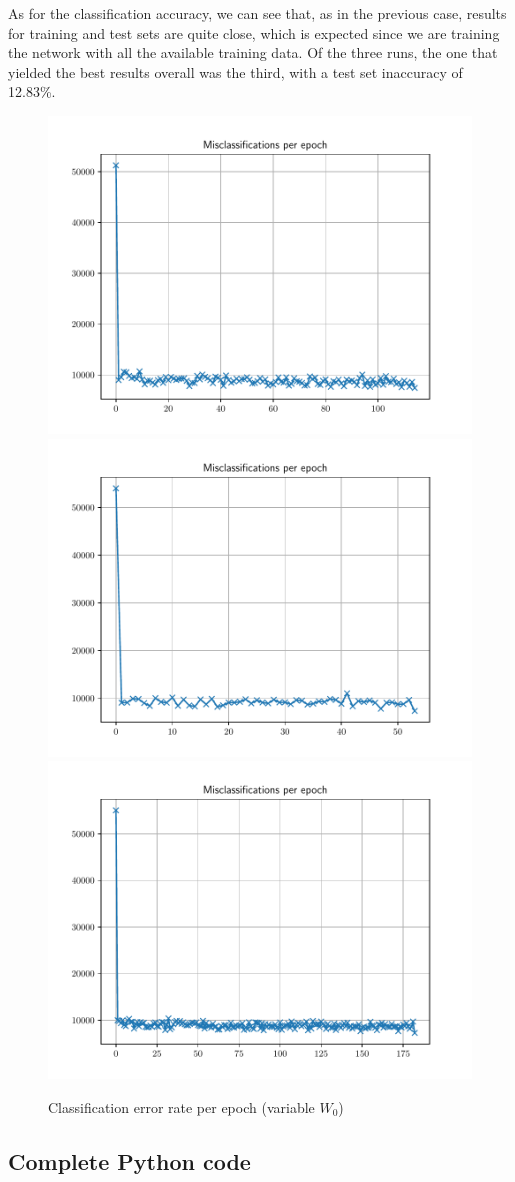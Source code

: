 \documentclass[letterpaper,headings=standardclasses]{scrartcl}
\begin{document}
As for the classification accuracy, we can see that, as in the previous case, results for training and test sets are quite close, which is expected since we are training the network with all the available training data. Of the three runs, the one that yielded the best results overall was the third, with a test set inaccuracy of 12.83\%.

\begin{figure}[h]
\centering
\includegraphics[width=.45\linewidth]{errors_60000_125_1.pdf}
\includegraphics[width=.45\linewidth]{errors_60000_125_2.pdf}
\includegraphics[width=.45\linewidth]{errors_60000_125_3.pdf}
\caption{Classification error rate per epoch (variable $W_0$)}
\label{errors_varw}
\end{figure}

\newpage

\subsection{Complete Python code}


\end{document}

